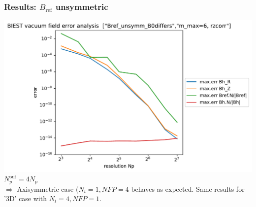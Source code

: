\documentclass[aspectratio=169]{beamer}
\newcommand{\textc}[1]{\textcolor{iagcolor}{#1}}
\begin{document}
\begin{frame}
 \frametitle{Results: $B_\text{ref}$ unsymmetric}
  \small\centering
 \includegraphics[height=0.7\textheight]{pics/BIEST_vf_err_Bref_unsymm_B0differs_m_max=6_rzcorr.pdf}\\$N_p^\text{out}=4 N_p$
  \\
  \textc{$\Rightarrow$ Axisymmetric case ($N_t=1,NFP=4$ behaves as expected. Same results for '3D' case with $N_t=4,NFP=1$.\\}
  
 
\end{frame}
\end{document}
